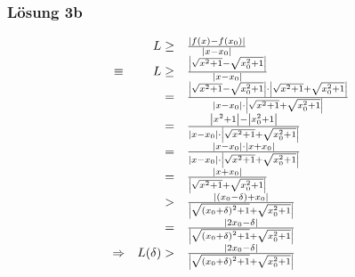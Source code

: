 \documentclass[main.tex]{subfiles}
\begin{document}
\subsubsection{Lösung 3b}

\begin{equation*}
    \begin{array}{ c r l }
     & L\geq  & \frac{| f( x) -f( x_{0})| }{| x-x_{0}| }\\
    \equiv  & L\geq  & \frac{\left| \sqrt{x^{2} +1} -\sqrt{x_{0}^{2} +1}\right| }{| x-x_{0}| }\\
     & = & \frac{\left| \sqrt{x^{2} +1} -\sqrt{x_{0}^{2} +1}\right| \cdot \left| \sqrt{x^{2} +1} +\sqrt{x_{0}^{2} +1}\right| }{| x-x_{0}| \cdot \left| \sqrt{x^{2} +1} +\sqrt{x_{0}^{2} +1}\right| }\\
     & = & \frac{\left| x^{2} +1\right| -\left| x_{0}^{2} +1\right| }{| x-x_{0}| \cdot \left| \sqrt{x^{2} +1} +\sqrt{x_{0}^{2} +1}\right| }\\
     & = & \frac{| x -x_{0}| \cdot | x+ x_{0}| }{| x-x_{0}| \cdot \left| \sqrt{x^{2} +1} +\sqrt{x_{0}^{2} +1}\right| }\\
     & = & \frac{| x+ x_{0}| }{\left| \sqrt{x^{2} +1} +\sqrt{x_{0}^{2} +1}\right| }\\
     &  > & \frac{| ( x_{0} -\delta ) + x_{0}| }{\left| \sqrt{{( x_{0} +\delta )}^{2} +1} +\sqrt{x_{0}^{2} +1}\right| }\\
     & = & \frac{| 2x_{0} -\delta | }{\left| \sqrt{{( x_{0} +\delta )}^{2} +1} +\sqrt{x_{0}^{2} +1}\right| }\\
    \Rightarrow  & L( \delta )  > & \frac{| 2x_{0} -\delta | }{\left| \sqrt{{( x_{0} +\delta )}^{2} +1} +\sqrt{x_{0}^{2} +1}\right| }
    \end{array}
\end{equation*}
\end{document}
